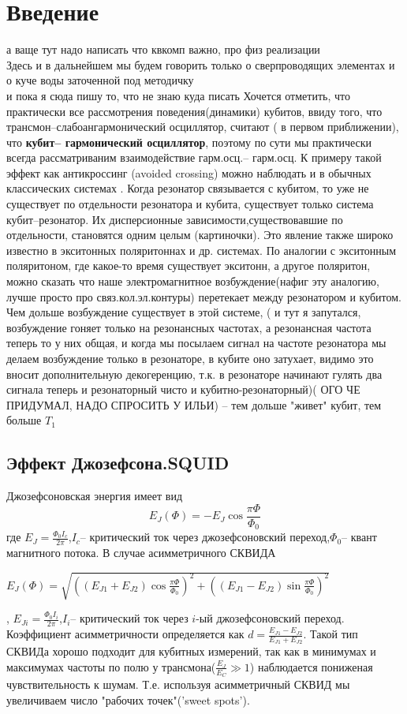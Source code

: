 \documentclass[12pt, twoside]{report}
\begin{document}
\tableofcontents
	\newpage

\chapter{Введение}
а ваще тут надо написать что квкомп важно, про физ реализации\\
 Здесь и в дальнейшем мы будем говорить только о сверпроводящих элементах и о куче воды заточенной под методичку\\ и пока я сюда пишу то, что не знаю куда писать
 Хочется отметить, что практически все рассмотрения поведения(динамики) кубитов, ввиду того, что трансмон--слабоангармонический осциллятор, считают ( в первом приближении), что \textbf{кубит-- гармонический осциллятор}, поэтому по сути мы практически всегда рассматриваним взаимодействие гарм.осц.-- гарм.осц. К примеру такой эффект как антикроссинг (avoided crossing) можно наблюдать и в обычных классических системах \cite{Novotny2010}. Когда резонатор связывается с кубитом, то уже не существует по отдельности резонатора и кубита, существует только система кубит--резонатор. Их дисперсионные зависимости,существовавшие по отдельности, становятся одним целым (картиночки). Это явление также широко известно в экситонных поляритоннах и др. системах. По аналогии с экситонным поляритоном, где какое-то время существует экситонн, а другое поляритон, можно сказать что наше электромагнитное возбуждение(нафиг эту аналогию, лучше просто про связ.кол.эл.контуры) перетекает между резонатором и кубитом. Чем дольше возбуждение существует в этой системе, ( и тут я запутался, возбуждение гоняет только на резонансных частотах, а резонансная частота теперь то у них общая, и когда мы посылаем сигнал на частоте резонатора мы делаем возбуждение только в резонаторе, в кубите оно затухает, видимо это вносит дополнительную декогеренцию, т.к. в резонаторе начинают гулять два сигнала теперь и резонаторный чисто и кубитно-резонаторный)( ОГО ЧЕ ПРИДУМАЛ, НАДО СПРОСИТЬ У ИЛЬИ) -- тем дольше "живет" кубит, тем больше $T_1$
	\section{Эффект Джозефсона.SQUID}
	Джозефсоновская энергия имеет вид 
\begin{equation}
	E_J(\Phi)=-E_J\cos{\frac{\pi\Phi}{\Phi_0}}
	\label{eq:jos}	
\end{equation}	
	 где $E_J=\frac{\Phi_0I_c}{2\pi}$,$I_c$-- критический ток через джозефсоновский переход,$\Phi_0$-- квант магнитного потока. 
	В случае асимметричного СКВИДА
\begin{center}
	$E_J(\Phi)=\sqrt{((E_{J1}+E_{J2})\cos{\frac{\pi\Phi}{\Phi_0}})^2+
	((E_{J1}-E_{J2})\sin{\frac{\pi\Phi}{\Phi_0}})^2}$
\end{center}	 , $E_{Ji}=\frac{\Phi_0I_i}{2\pi}$,$I_i$-- критический ток через $i$-ый джозефсоновский переход.
Коэффициент асимметричности определяется как $d=\frac{E_{J1}-E_{J2}}{E_{J1}+E_{J2}}$. Такой тип СКВИДа хорошо подходит для кубитных измерений, так как в минимумах и максимумах частоты по полю  у трансмона($\frac{E_J}{E_C}\gg1$) наблюдается пониженая чувствительность к шумам. Т.е. используя асимметричный СКВИД мы увеличиваем число "рабочих точек"('sweet spots')\cite{Koch2007}.  
\end{document}
